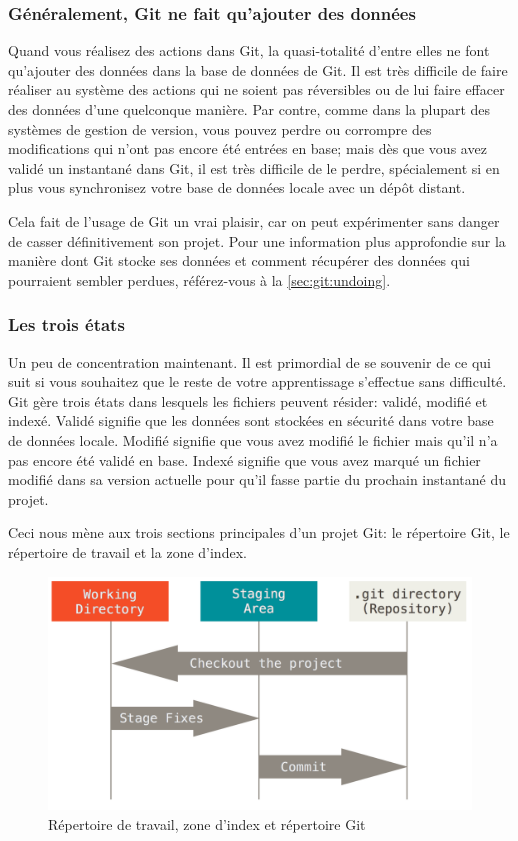 \subsubsection{Généralement, Git ne fait qu'ajouter des données}

Quand vous réalisez des actions dans Git, la quasi-totalité d'entre elles ne font qu'ajouter des données dans la base de données de Git.
Il est très difficile de faire réaliser au système des actions qui ne soient pas réversibles ou de lui faire effacer des données d'une quelconque manière.
Par contre, comme dans la plupart des systèmes de gestion de version, vous pouvez perdre ou corrompre des modifications qui n'ont pas encore été entrées en base;
mais dès que vous avez validé un instantané dans Git, il est très difficile de le perdre, spécialement si en plus vous synchronisez votre base de données locale avec un dépôt distant.

Cela fait de l'usage de Git un vrai plaisir, car on peut expérimenter sans danger de casser définitivement son projet.
Pour une information plus approfondie sur la manière dont Git stocke ses données et comment récupérer des données qui pourraient sembler perdues, référez-vous à la \autoref{sec:git:undoing}.

\subsubsection{Les trois états}

Un peu de concentration maintenant.
Il est primordial de se souvenir de ce qui suit si vous souhaitez que le reste de votre apprentissage s'effectue sans difficulté.
Git gère trois états dans lesquels les fichiers peuvent résider: validé, modifié et indexé.
Validé signifie que les données sont stockées en sécurité dans votre base de données locale.
Modifié signifie que vous avez modifié le fichier mais qu'il n'a pas encore été validé en base.
Indexé signifie que vous avez marqué un fichier modifié dans sa version actuelle pour qu'il fasse partie du prochain instantané du projet.

Ceci nous mène aux trois sections principales d'un projet Git: le répertoire Git, le répertoire de travail et la zone d'index.

\begin{figure}[H]
  \centering
  \includegraphics{images/areas}
  \caption{Répertoire de travail, zone d'index et répertoire Git}
  \label{fig:git:areas}
\end{figure}

